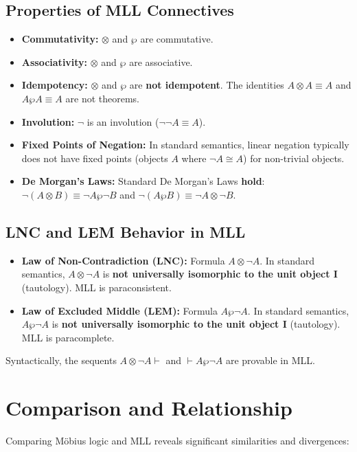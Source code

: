 	\subsection{Properties of MLL Connectives}
	\begin{itemize}
		\item \textbf{Commutativity:} $\otimes$ and $\wp$ are commutative.
		\item \textbf{Associativity:} $\otimes$ and $\wp$ are associative.
		\item \textbf{Idempotency:} $\otimes$ and $\wp$ are \textbf{not idempotent}. The identities $A \otimes A \equiv A$ and $A \wp A \equiv A$ are not theorems.
		\item \textbf{Involution:} $\neg$ is an involution ($\neg \neg A \equiv A$).
		\item \textbf{Fixed Points of Negation:} In standard semantics, linear negation typically does not have fixed points (objects $A$ where $\neg A \cong A$) for non-trivial objects.
		\item \textbf{De Morgan's Laws:} Standard De Morgan's Laws \textbf{hold}: $\neg(A \otimes B) \equiv \neg A \wp \neg B$ and $\neg(A \wp B) \equiv \neg A \otimes \neg B$.
	\end{itemize}

	\subsection{LNC and LEM Behavior in MLL}
	\begin{itemize}
		\item \textbf{Law of Non-Contradiction (LNC):} Formula $A \otimes \neg A$.
		In standard semantics, $A \otimes \neg A$ is \textbf{not universally isomorphic to the unit object I} (tautology). MLL is paraconsistent.
		\item \textbf{Law of Excluded Middle (LEM):} Formula $A \wp \neg A$.
		In standard semantics, $A \wp \neg A$ is \textbf{not universally isomorphic to the unit object I} (tautology). MLL is paracomplete.
	\end{itemize}
	Syntactically, the sequents $A \otimes \neg A \vdash$ and $\vdash A \wp \neg A$ are provable in MLL.

	\section{Comparison and Relationship}

	Comparing M\"{o}bius logic and MLL reveals significant similarities and divergences:

